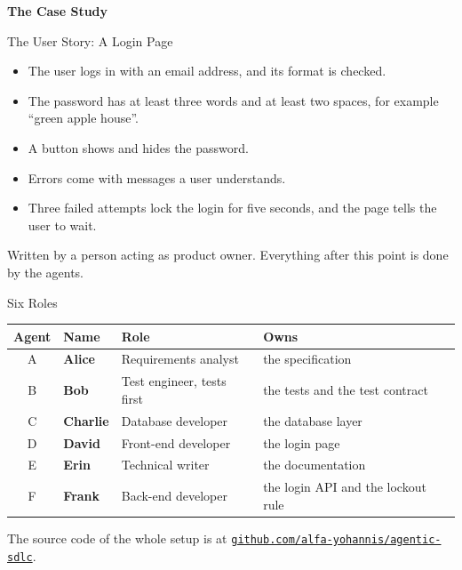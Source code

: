 \documentclass[aspectratio=169, table, 12pt]{beamer}
\begin{document}
\begin{frame}{\hfill}
  \centering
  \Huge{\textbf{The Case Study}}
\end{frame}

\begin{frame}{{\Large The User Story: A Login Page}}
  \vspace{10pt}
  \begin{itemize}
    \item The user logs in with an email address, and its format is checked.
    \item The password has at least three words and at least two spaces, for
          example ``green apple house''.
    \item A button shows and hides the password.
    \item Errors come with messages a user understands.
    \item Three failed attempts lock the login for five seconds, and the page
          tells the user to wait.
  \end{itemize}
  \vspace{8pt}
  {\small Written by a person acting as product owner. Everything after this
  point is done by the agents.}
\end{frame}

\begin{frame}{{\Large Six Roles}}
  \vspace{4pt}
  \centering
  {\footnotesize
  \begin{tabularx}{\textwidth}{clYY}
    \hline
    \textbf{Agent} & \textbf{Name} & \textbf{Role} & \textbf{Owns} \\
    \hline
    A & \textcolor{alicecolor}{\textbf{Alice}} & Requirements analyst & the specification \\
    \hline
    B & \textcolor{bobcolor}{\textbf{Bob}} & Test engineer, tests first & the tests and the test contract \\
    \hline
    C & \textcolor{charliecolor}{\textbf{Charlie}} & Database developer & the database layer \\
    \hline
    D & \textcolor{davidcolor}{\textbf{David}} & Front-end developer & the login page \\
    \hline
    E & \textcolor{erincolor}{\textbf{Erin}} & Technical writer & the documentation \\
    \hline
    F & \textcolor{frankcolor}{\textbf{Frank}} & Back-end developer & the login API and the lockout rule \\
    \hline
  \end{tabularx}}

  \vspace{8pt}
  {\small The source code of the whole setup is at
  \href{https://github.com/alfa-yohannis/agentic-sdlc}{\texttt{github.com/alfa-yohannis/agentic-sdlc}}.}
\end{frame}
\end{document}
